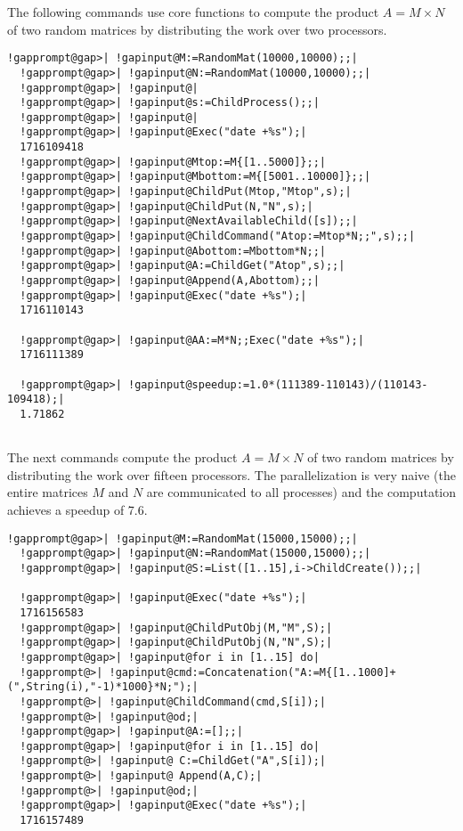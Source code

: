 \documentclass[a4paper,11pt]{report}
\begin{document}
{{The following commands use core functions to compute the product $A=M\times N$ of two random matrices by distributing the work over two processors. 
\begin{Verbatim}[commandchars=!@|,fontsize=\small,frame=single,label=Example]
  !gapprompt@gap>| !gapinput@M:=RandomMat(10000,10000);;|
  !gapprompt@gap>| !gapinput@N:=RandomMat(10000,10000);;|
  !gapprompt@gap>| !gapinput@|
  !gapprompt@gap>| !gapinput@s:=ChildProcess();;|
  !gapprompt@gap>| !gapinput@|
  !gapprompt@gap>| !gapinput@Exec("date +%s");|
  1716109418
  !gapprompt@gap>| !gapinput@Mtop:=M{[1..5000]};;|
  !gapprompt@gap>| !gapinput@Mbottom:=M{[5001..10000]};;|
  !gapprompt@gap>| !gapinput@ChildPut(Mtop,"Mtop",s);|
  !gapprompt@gap>| !gapinput@ChildPut(N,"N",s);|
  !gapprompt@gap>| !gapinput@NextAvailableChild([s]);;|
  !gapprompt@gap>| !gapinput@ChildCommand("Atop:=Mtop*N;;",s);;|
  !gapprompt@gap>| !gapinput@Abottom:=Mbottom*N;;|
  !gapprompt@gap>| !gapinput@A:=ChildGet("Atop",s);;|
  !gapprompt@gap>| !gapinput@Append(A,Abottom);;|
  !gapprompt@gap>| !gapinput@Exec("date +%s");|
  1716110143
  
  !gapprompt@gap>| !gapinput@AA:=M*N;;Exec("date +%s");|
  1716111389
  
  !gapprompt@gap>| !gapinput@speedup:=1.0*(111389-110143)/(110143-109418);|
  1.71862
  
\end{Verbatim}
 

The next commands compute the product $A=M\times N$ of two random matrices by distributing the work over fifteen processors. The
parallelization is very naive (the entire matrices $M$ and $N$ are communicated to all processes) and the computation achieves a speedup of
7.6. 
\begin{Verbatim}[commandchars=!@|,fontsize=\small,frame=single,label=Example]
  !gapprompt@gap>| !gapinput@M:=RandomMat(15000,15000);;|
  !gapprompt@gap>| !gapinput@N:=RandomMat(15000,15000);;|
  !gapprompt@gap>| !gapinput@S:=List([1..15],i->ChildCreate());;|
  
  !gapprompt@gap>| !gapinput@Exec("date +%s");|
  1716156583
  !gapprompt@gap>| !gapinput@ChildPutObj(M,"M",S);|
  !gapprompt@gap>| !gapinput@ChildPutObj(N,"N",S);|
  !gapprompt@gap>| !gapinput@for i in [1..15] do|
  !gapprompt@>| !gapinput@cmd:=Concatenation("A:=M{[1..1000]+(",String(i),"-1)*1000}*N;");|
  !gapprompt@>| !gapinput@ChildCommand(cmd,S[i]);|
  !gapprompt@>| !gapinput@od;|
  !gapprompt@gap>| !gapinput@A:=[];;|
  !gapprompt@gap>| !gapinput@for i in [1..15] do|
  !gapprompt@>| !gapinput@ C:=ChildGet("A",S[i]);|
  !gapprompt@>| !gapinput@ Append(A,C);|
  !gapprompt@>| !gapinput@od;|
  !gapprompt@gap>| !gapinput@Exec("date +%s");|
  1716157489
  

\end{Verbatim}}}
\end{document}
